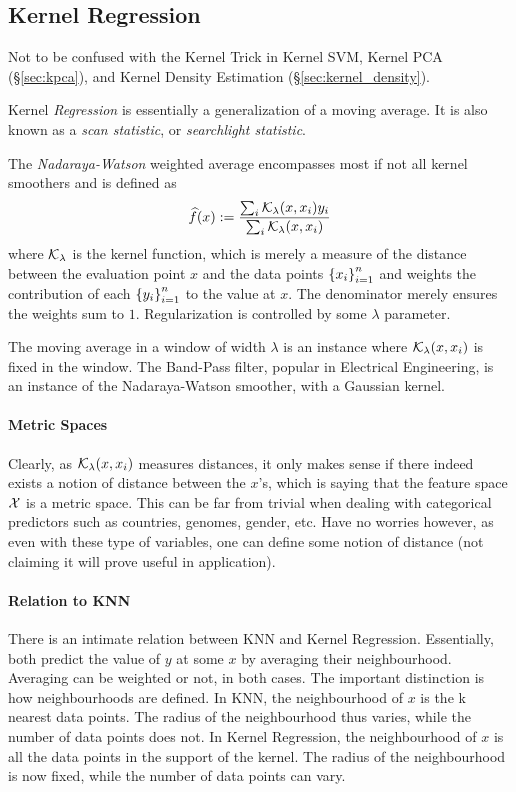 \subsection{Kernel Regression}
\label{sec:kernel}

Not to be confused with the Kernel Trick in Kernel SVM, Kernel PCA (\S\ref{sec:kpca}), and Kernel Density Estimation (\S\ref{sec:kernel_density}).

Kernel \emph{Regression} is essentially a generalization of a moving average.
It is also known as a \emph{scan statistic}, or \emph{searchlight statistic}.

The \emph{Nadaraya-Watson} weighted average encompasses most if not all kernel smoothers and is defined as 
\begin{align}
\label{eq:nadaraya_watson}
	\widehat{f}(x):= \frac{\sum_i \mathcal{K}_\lambda(x,x_i)y_i}{\sum_i \mathcal{K}_\lambda(x,x_i)}
\end{align}
where $\mathcal{K}_\lambda$ is the kernel function, which is merely a measure of the distance between the evaluation point $x$ and the data points $\left\{  x_i  \right\}_{i=1}^n$ and weights the contribution of each $\left\{  y_i  \right\}_{i=1}^n$ to the value at $x$.
The denominator merely ensures the weights sum to $1$.
Regularization is controlled by some $\lambda$ parameter.

The moving average in a window of width $\lambda$ is an instance where $\mathcal{K}_\lambda(x,x_i)$ is fixed in the window.
The Band-Pass filter, popular in Electrical Engineering, is an instance of the Nadaraya-Watson smoother, with a Gaussian kernel. %


\paragraph{Metric Spaces}
Clearly, as $\mathcal{K}_\lambda(x,x_i)$ measures distances, it only makes sense if there indeed exists a notion of distance between the $x$'s, which is saying that the feature space $\mathcal{X}$ is a metric space. 
This can be far from trivial when dealing with categorical predictors such as countries, genomes, gender, etc.
Have no worries however, as even with these type of variables, one can define some notion of distance (not claiming it will prove useful in application).


\paragraph{Relation to KNN}
There is an intimate relation between KNN and Kernel Regression. 
Essentially, both predict the value of $y$ at some $x$ by averaging their neighbourhood. 
Averaging can be weighted or not, in both cases.
The important distinction is how neighbourhoods are defined.
In KNN, the neighbourhood of $x$ is the k nearest data points. The radius of the neighbourhood thus varies, while the number of data points does not.
In Kernel Regression, the neighbourhood of $x$ is all the data points in the support of the kernel. The radius of the neighbourhood is now fixed, while the number of data points can vary.




